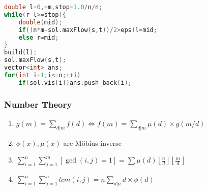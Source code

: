 \begin{enumerate}
\begin{enumerate}
	\end{enumerate}
\end{enumerate}
\begin{lstlisting}[language=C++]
double l=0,=m,stop=1.0/n/n;
while(r-l>=stop){
	double(mid);
	if((n*m-sol.maxFlow(s,t))/2>eps)l=mid;
	else r=mid;
}
build(l);
sol.maxFlow(s,t);
vector<int> ans;
for(int i=1;i<=n;++i)
	if(sol.vis[i])ans.push_back(i);
\end{lstlisting}



\subsubsection{Number Theory}
\begin{enumerate}\itemsep = -3pt
  \item $g(m)=\sum_{d|m}f(d)\Leftrightarrow f(m)=\sum_{d|m}\mu (d) \times g(m/d)$
  \item $\phi(x), \mu(x)$ are Möbius inverse
  \item $\sum_{i=1}^n\sum_{j=1}^m [\gcd(i, j) = 1]=\sum \mu(d)\left \lfloor \frac{n}{d} \right \rfloor \left \lfloor \frac{m}{d} \right \rfloor$
  \item $\sum_{i=1}^n\sum_{j=1}^nlcm(i,j)=n\sum_{d|n} d \times \phi (d)$
\end{enumerate}

